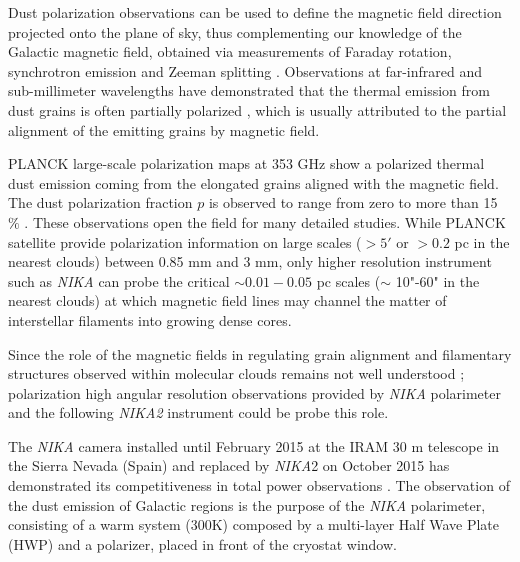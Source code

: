 \documentclass[twocolumn,traditabstract]{aa}
\begin{document}
	Dust polarization observations can be used to define the magnetic field direction projected onto the plane of sky, thus complementing our knowledge of the Galactic magnetic field, obtained via measurements of Faraday rotation, synchrotron emission and Zeeman splitting \citep{crutcher2010}.
Observations at far-infrared and sub-millimeter wavelengths have demonstrated that the thermal emission from dust grains is often partially polarized \citep{schle1998, brenda2000}, which is usually attributed to the partial alignment of the emitting grains by magnetic field. 

 PLANCK large-scale polarization maps at 353 GHz show a polarized thermal dust emission coming from the elongated grains aligned with the magnetic field. The dust polarization fraction $p$ is observed to range from zero to more than 15 $\%$ \citep{planckdust}. These observations open the field for many detailed studies.
While PLANCK satellite provide polarization information on large scales ($> 5'$ or $> 0.2$ pc in the nearest clouds) between 0.85 mm and 3 mm, only higher resolution instrument such as {\it NIKA} can probe the critical $\sim 0.01 - 0.05 $ pc scales ($\sim$ 10"-60" in the nearest clouds) at which magnetic field lines may channel the matter of interstellar filaments into growing dense cores.

Since the role of the magnetic fields in regulating grain alignment and filamentary structures observed within molecular clouds remains not well understood \citep{Fiege2000}; polarization high angular resolution observations provided by {\it NIKA} polarimeter and the following {\it NIKA2} instrument could be probe this role. 

The {\it NIKA} camera installed until February 2015 at the IRAM 30 m telescope in the Sierra Nevada (Spain) and replaced by {\it NIKA}2 on October 2015 has demonstrated its competitiveness in total power observations \citep{catalano2014, adam2014, adam2015}.
The observation of the dust emission of Galactic regions is the purpose of the {\it NIKA} polarimeter, consisting of a warm system (300K) composed by a multi-layer Half Wave Plate (HWP) and a polarizer, placed in front of the cryostat window. 
\end{document}
